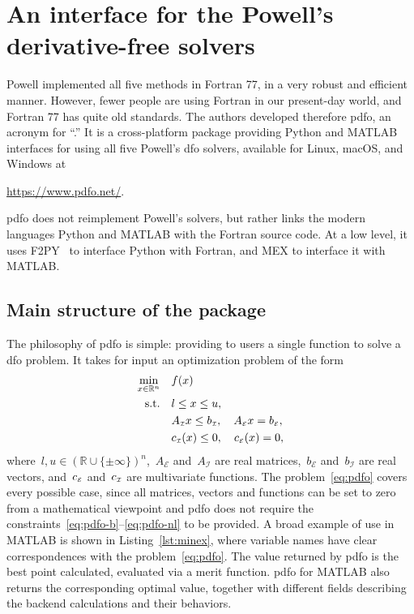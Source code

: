 \documentclass[
    smallextended,  %
    final,        %
]{svjour3}
\newcommand{\R}{\mathbb{R}}
\newcommand{\aeq}{A_{\scriptscriptstyle\mathcal{E}}}
\newcommand{\aub}{A_{\scriptscriptstyle\mathcal{I}}}
\newcommand{\beq}{b_{\scriptscriptstyle\mathcal{E}}}
\newcommand{\bub}{b_{\scriptscriptstyle\mathcal{I}}}
\newcommand{\ceq}{\con[\scriptscriptstyle\mathcal{E}]}
\newcommand{\con}[1][i]{c\ifthenelse{\equal{#1}{}}{}{_{#1}}}
\newcommand{\cub}{\con[\scriptscriptstyle\mathcal{I}]}
\newcommand{\obj}{f}
\newcommand{\set}[2][]{#1\{#2#1\}}
\newcommand{\st}{\text{s.t.}}
\newcommand{\xl}{l}
\newcommand{\xu}{u}
\begin{document}
\section{An interface for the Powell's derivative-free solvers}
\label{sec:pdfo}

Powell implemented all five methods in Fortran 77, in a very robust and efficient manner.
However, fewer people are using Fortran in our present-day world, and Fortran 77 has quite old standards.
The authors developed therefore \gls{pdfo}, an acronym for ``.''
It is a cross-platform package providing Python and MATLAB interfaces for using all five Powell's \gls{dfo} solvers, available for Linux, macOS, and Windows at
\begin{center}
    \url{https://www.pdfo.net/}.
\end{center}
\Gls{pdfo} does not reimplement Powell's solvers, but rather links the modern languages Python and MATLAB with the Fortran source code.
At a low level, it uses F2PY~\cite{Peterson_2009} to interface Python with Fortran, and MEX to interface it with MATLAB.

\subsection{Main structure of the package}

The philosophy of \gls{pdfo} is simple: providing to users a single function to solve a \gls{dfo} problem.
It takes for input an optimization problem of the form
\begin{subequations}
    \label{eq:pdfo}
    \begin{align}
        \min_{x \in \R^n}   & \quad \obj(x)\\
        \st                 & \quad \xl \le x \le \xu, \label{eq:pdfo-b}\\
                            & \quad \aub x \le \bub, \quad \aeq x = \beq, \label{eq:pdfo-l}\\
                            & \quad \cub(x) \le 0, \quad \ceq(x) = 0, \label{eq:pdfo-nl}
    \end{align}
\end{subequations}
where~$\xl, \xu \in (\R \cup \set{\pm \infty})^n$,~$\aeq$ and~$\aub$ are real matrices,~$\beq$ and~$\bub$ are real vectors, and~$\ceq$ and~$\cub$ are multivariate functions.
The problem~\eqref{eq:pdfo} covers every possible case, since all matrices, vectors and functions can be set to zero from a mathematical viewpoint and \gls{pdfo} does not
require the constraints~\mbox{\eqref{eq:pdfo-b}--\eqref{eq:pdfo-nl}} to be provided.
A broad example of use in MATLAB is shown in Listing~\ref{lst:minex}, where variable names have clear correspondences with the problem~\eqref{eq:pdfo}.
The value returned by \gls{pdfo} is the best point calculated, evaluated via a merit function.
\Gls{pdfo} for MATLAB also returns the corresponding optimal value, together with different fields describing the backend calculations and their behaviors.
\end{document}
